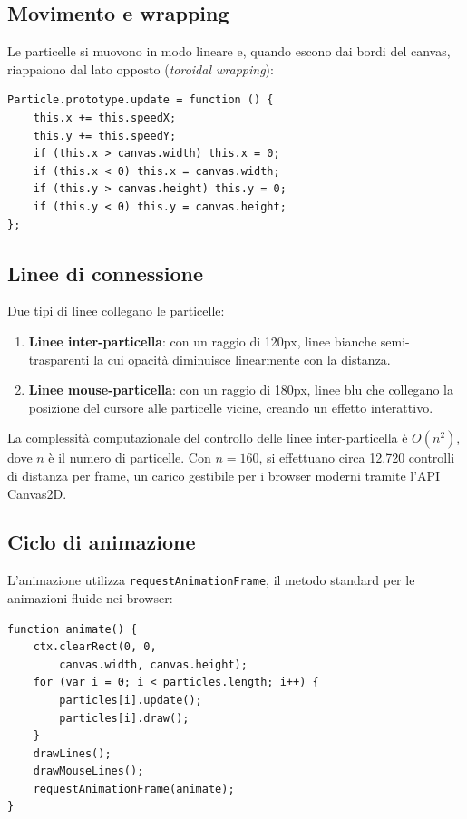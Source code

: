 \documentclass[a4paper,12pt]{report}
\begin{document}
\subsection{Movimento e wrapping}

Le particelle si muovono in modo lineare e, quando escono dai bordi del canvas, riappaiono dal lato opposto (\textit{toroidal wrapping}):

\begin{lstlisting}[style=jsstyle, caption={Aggiornamento posizione}]
Particle.prototype.update = function () {
    this.x += this.speedX;
    this.y += this.speedY;
    if (this.x > canvas.width) this.x = 0;
    if (this.x < 0) this.x = canvas.width;
    if (this.y > canvas.height) this.y = 0;
    if (this.y < 0) this.y = canvas.height;
};
\end{lstlisting}

\subsection{Linee di connessione}

Due tipi di linee collegano le particelle:

\begin{enumerate}[leftmargin=2cm]
    \item \textbf{Linee inter-particella}: con un raggio di 120px, linee bianche semi-trasparenti la cui opacit\`a diminuisce linearmente con la distanza.
    \item \textbf{Linee mouse-particella}: con un raggio di 180px, linee blu che collegano la posizione del cursore alle particelle vicine, creando un effetto interattivo.
\end{enumerate}

La complessit\`a computazionale del controllo delle linee inter-particella \`e $O(n^2)$, dove $n$ \`e il numero di particelle. Con $n = 160$, si effettuano circa 12.720 controlli di distanza per frame, un carico gestibile per i browser moderni tramite l'API Canvas2D.

\subsection{Ciclo di animazione}

L'animazione utilizza \texttt{requestAnimationFrame}, il metodo standard per le animazioni fluide nei browser:

\begin{lstlisting}[style=jsstyle, caption={Loop di animazione}]
function animate() {
    ctx.clearRect(0, 0,
        canvas.width, canvas.height);
    for (var i = 0; i < particles.length; i++) {
        particles[i].update();
        particles[i].draw();
    }
    drawLines();
    drawMouseLines();
    requestAnimationFrame(animate);
}
\end{lstlisting}
\end{document}
